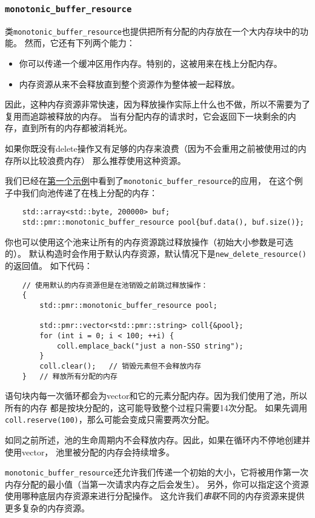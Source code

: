 \subsubsection{\texttt{monotonic\_buffer\_resource}}
类\texttt{monotonic\_buffer\_resource}也提供把所有分配的内存放在一个大内存块中的功能。
然而，它还有下列两个能力：
\begin{itemize}
    \item 你可以传递一个缓冲区用作内存。特别的，这被用来在栈上分配内存。
    \item 内存资源从来不会释放直到整个资源作为整体被一起释放。
\end{itemize}
因此，这种内存资源非常快速，因为释放操作实际上什么也不做，所以不需要为了复用而追踪被释放的内存。
当有分配内存的请求时，它会返回下一块剩余的内存，直到所有的内存都被消耗光。

如果你既没有delete操作又有足够的内存来浪费（因为不会重用之前被使用过的内存所以比较浪费内存）
那么推荐使用这种资源。

我们已经在\hyperref[ch29.1.1.1]{第一个示例}中看到了\texttt{monotonic\_buffer\_resource}的应用，
在这个例子中我们向池传递了在栈上分配的内存：
\begin{lstlisting}
    std::array<std::byte, 200000> buf;
    std::pmr::monotonic_buffer_resource pool{buf.data(), buf.size()};
\end{lstlisting}
你也可以使用这个池来让所有的内存资源跳过释放操作（初始大小参数是可选的）。
默认构造时会作用于默认内存资源，默认情况下是\texttt{new\_delete\_resource()}的返回值。
如下代码：
\begin{lstlisting}
    // 使用默认的内存资源但是在池销毁之前跳过释放操作：
    {
        std::pmr::monotonic_buffer_resource pool;

        std::pmr::vector<std::pmr::string> coll{&pool};
        for (int i = 0; i < 100; ++i) {
            coll.emplace_back("just a non-SSO string");
        }
        coll.clear();   // 销毁元素但不会释放内存
    }   // 释放所有分配的内存
\end{lstlisting}
语句块内每一次循环都会为vector和它的元素分配内存。因为我们使用了池，所以所有的内存
都是按块分配的，这可能导致整个过程只需要14次分配。
如果先调用\texttt{coll.reserve(100)}，那么可能会变成只需要两次分配。

如同之前所述，池的生命周期内不会释放内存。因此，如果在循环内不停地创建并使用vector，
池里被分配的内存会持续增多。

\texttt{monotonic\_buffer\_resource}还允许我们传递一个初始的大小，它将被用作第一次
内存分配的最小值（当第一次请求内存之后会发生）。
另外，你可以指定这个资源使用哪种底层内存资源来进行分配操作。
这允许我们\emph{串联}不同的内存资源来提供更多复杂的内存资源。

